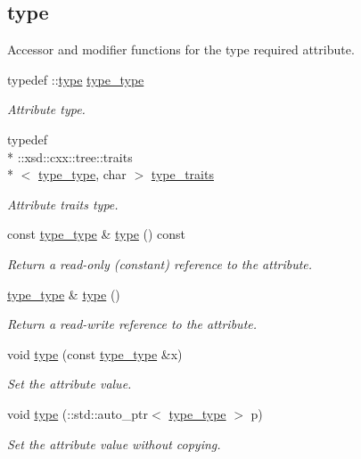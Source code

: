 \subsection*{type}
\label{_amgrp599dcce2998a6b40b1e38e8c6006cb0a}%
Accessor and modifier functions for the type required attribute. \begin{DoxyCompactItemize}
\item 
typedef \-::\hyperlink{classtype}{type} \hyperlink{classDataArray__t_a484a0509e4f141d9970d75881703a51e}{type\-\_\-type}
\begin{DoxyCompactList}\small\item\em Attribute type. \end{DoxyCompactList}\item 
typedef \\*
\-::xsd\-::cxx\-::tree\-::traits\\*
$<$ \hyperlink{classDataArray__t_a484a0509e4f141d9970d75881703a51e}{type\-\_\-type}, char $>$ \hyperlink{classDataArray__t_af1dc5f097a8645ae42b57eb3a0b10fa2}{type\-\_\-traits}
\begin{DoxyCompactList}\small\item\em Attribute traits type. \end{DoxyCompactList}\item 
const \hyperlink{classDataArray__t_a484a0509e4f141d9970d75881703a51e}{type\-\_\-type} \& \hyperlink{classDataArray__t_a6ec3c246d1a2fddc7052bcde2cb6bdf7}{type} () const 
\begin{DoxyCompactList}\small\item\em Return a read-\/only (constant) reference to the attribute. \end{DoxyCompactList}\item 
\hyperlink{classDataArray__t_a484a0509e4f141d9970d75881703a51e}{type\-\_\-type} \& \hyperlink{classDataArray__t_a29f3ed42a5bf8df9437ece5f63c02301}{type} ()
\begin{DoxyCompactList}\small\item\em Return a read-\/write reference to the attribute. \end{DoxyCompactList}\item 
void \hyperlink{classDataArray__t_ae4fd6c47e992055ec42cc1949b60da2a}{type} (const \hyperlink{classDataArray__t_a484a0509e4f141d9970d75881703a51e}{type\-\_\-type} \&x)
\begin{DoxyCompactList}\small\item\em Set the attribute value. \end{DoxyCompactList}\item 
void \hyperlink{classDataArray__t_afa90d226889ba3e7baa5c8e9dba594d2}{type} (\-::std\-::auto\-\_\-ptr$<$ \hyperlink{classDataArray__t_a484a0509e4f141d9970d75881703a51e}{type\-\_\-type} $>$ p)
\begin{DoxyCompactList}\small\item\em Set the attribute value without copying. \end{DoxyCompactList}\end{DoxyCompactItemize}
